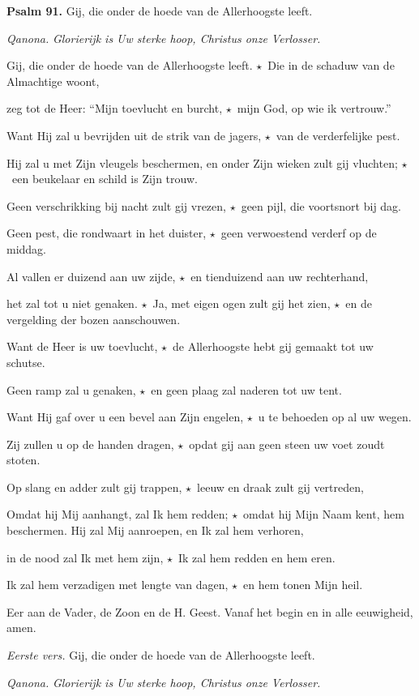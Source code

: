 \documentclass[12pt,twoside,a5paper]{article}
\newlength{\origparskip}
\newenvironment{halfparskip}{
  \setlength{\parskip}{0.5\origparskip}
}{
  \setlength{\parskip}{\origparskip}
}
\newcommand{\sep}{{\color{BrickRed} \textbf{$\star$}}}
\newcommand{\liturgicalhint}[1]{{\color{BrickRed}\footnotesize\itshape{#1}}}
\newcommand{\liturgicaloption}[1]{{\color{BrickRed}\textbf{#1}}}
\newcommand{\qanona}[1]{{\liturgicalhint{Qanona.}} \emph{#1}}
\newcommand{\psalm}[1]{\liturgicaloption{Psalm #1.}}
\begin{document}
\begin{halfparskip}
  \psalm{91} Gij, die onder de hoede van de Allerhoogste leeft.

  \qanona{Glorierijk is Uw sterke hoop, Christus onze Verlosser.}

  Gij, die onder de hoede van de Allerhoogste leeft. \sep\ Die in de schaduw van de Almachtige woont,

  zeg tot de Heer: ``Mijn toevlucht en burcht, \sep\ mijn God, op wie ik vertrouw.''

  Want Hij zal u bevrijden uit de strik van de jagers, \sep\ van de verderfelijke pest.

  Hij zal u met Zijn vleugels beschermen, en onder Zijn wieken zult gij vluchten; \sep\ een beukelaar en schild is Zijn trouw.

  Geen verschrikking bij nacht zult gij vrezen, \sep\ geen pijl, die voortsnort bij dag.

  Geen pest, die rondwaart in het duister, \sep\ geen verwoestend verderf op de middag.

  Al vallen er duizend aan uw zijde, \sep\ en tienduizend aan uw rechterhand,

  het zal tot u niet genaken. \sep\ Ja, met eigen ogen zult gij het zien, \sep\ en de vergelding der bozen aanschouwen.

  Want de Heer is uw toevlucht, \sep\ de Allerhoogste hebt gij gemaakt tot uw schutse.

  Geen ramp zal u genaken, \sep\ en geen plaag zal naderen tot uw tent.

  Want Hij gaf over u een bevel aan Zijn engelen, \sep\ u te behoeden op al uw wegen.

  Zij zullen u op de handen dragen, \sep\ opdat gij aan geen steen uw voet zoudt stoten.

  Op slang en adder zult gij trappen, \sep\ leeuw en draak zult gij vertreden,

  Omdat hij Mij aanhangt, zal Ik hem redden; \sep\ omdat hij Mijn Naam kent, hem beschermen. Hij zal Mij aanroepen, en Ik zal hem verhoren,

  in de nood zal Ik met hem zijn, \sep\ Ik zal hem redden en hem eren.

  Ik zal hem verzadigen met lengte van dagen, \sep\ en hem tonen Mijn heil.

  Eer aan de Vader, de Zoon en de H. Geest. Vanaf het begin en in alle eeuwigheid, amen.

  \liturgicalhint{Eerste vers.} Gij, die onder de hoede van de Allerhoogste leeft.

  \qanona{Glorierijk is Uw sterke hoop, Christus onze Verlosser.}
\end{halfparskip}
\end{document}
